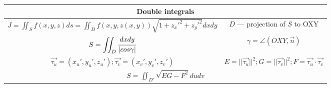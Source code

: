 \begin{tabular}{c|c}
	    \multicolumn{2}{c}{Double integrals} \\
	\hline

	$\displaystyle J = \iint_S f(x,y,z)ds = \iint_D f(x,y,z(x,y))\sqrt{
	1+z_x'^2+z_y'^2}dxdy$ & $D$ --- projection of $S$ to OXY \\
	
	$\displaystyle S = \iint_D \cfrac{dxdy}{|cos \gamma|}$ & $\gamma = \angle(OXY, \vec{n})$ \\
	
	$\displaystyle \vec{\tau_u} = (x_u',y_u',z_u'); \vec{\tau_v} = (x_v',y_v',z_v') $ & $ \displaystyle E = ||\vec{\tau_u}||^2; G = ||\vec{\tau_v}||^2; F = \vec{\tau_u} \cdot \vec{\tau_v}$ \\
	
	\multicolumn{2}{c}{$\displaystyle S = \iint_{D'}\sqrt{EG - F^2}dudv$} \\
	\hline
\end{tabular}